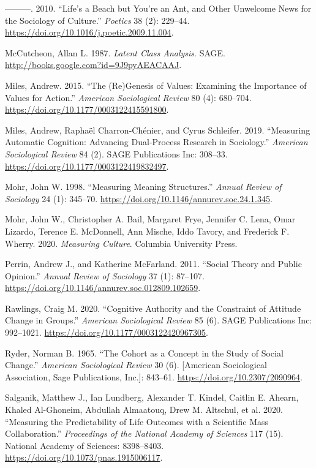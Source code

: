 \documentclass[12pt,]{article}
\begin{document}
\leavevmode\hypertarget{ref-martin2010}{}%
---------. 2010. ``Life's a Beach but You're an Ant, and Other Unwelcome News for the Sociology of Culture.'' \emph{Poetics} 38 (2): 229--44. \url{https://doi.org/10.1016/j.poetic.2009.11.004}.

\leavevmode\hypertarget{ref-mccutcheon1987}{}%
McCutcheon, Allan L. 1987. \emph{Latent Class Analysis}. SAGE. \url{http://books.google.com?id=9J9pyAEACAAJ}.

\leavevmode\hypertarget{ref-miles2015}{}%
Miles, Andrew. 2015. ``The (Re)Genesis of Values: Examining the Importance of Values for Action.'' \emph{American Sociological Review} 80 (4): 680--704. \url{https://doi.org/10.1177/0003122415591800}.

\leavevmode\hypertarget{ref-miles2019}{}%
Miles, Andrew, Raphaël Charron-Chénier, and Cyrus Schleifer. 2019. ``Measuring Automatic Cognition: Advancing Dual-Process Research in Sociology.'' \emph{American Sociological Review} 84 (2). SAGE Publications Inc: 308--33. \url{https://doi.org/10.1177/0003122419832497}.

\leavevmode\hypertarget{ref-mohr1998}{}%
Mohr, John W. 1998. ``Measuring Meaning Structures.'' \emph{Annual Review of Sociology} 24 (1): 345--70. \url{https://doi.org/10.1146/annurev.soc.24.1.345}.

\leavevmode\hypertarget{ref-mohr2020}{}%
Mohr, John W., Christopher A. Bail, Margaret Frye, Jennifer C. Lena, Omar Lizardo, Terence E. McDonnell, Ann Mische, Iddo Tavory, and Frederick F. Wherry. 2020. \emph{Measuring Culture}. Columbia University Press.

\leavevmode\hypertarget{ref-perrin2011}{}%
Perrin, Andrew J., and Katherine McFarland. 2011. ``Social Theory and Public Opinion.'' \emph{Annual Review of Sociology} 37 (1): 87--107. \url{https://doi.org/10.1146/annurev.soc.012809.102659}.

\leavevmode\hypertarget{ref-rawlings2020}{}%
Rawlings, Craig M. 2020. ``Cognitive Authority and the Constraint of Attitude Change in Groups.'' \emph{American Sociological Review} 85 (6). SAGE Publications Inc: 992--1021. \url{https://doi.org/10.1177/0003122420967305}.

\leavevmode\hypertarget{ref-ryder1965}{}%
Ryder, Norman B. 1965. ``The Cohort as a Concept in the Study of Social Change.'' \emph{American Sociological Review} 30 (6). {[}American Sociological Association, Sage Publications, Inc.{]}: 843--61. \url{https://doi.org/10.2307/2090964}.

\leavevmode\hypertarget{ref-salganik2020}{}%
Salganik, Matthew J., Ian Lundberg, Alexander T. Kindel, Caitlin E. Ahearn, Khaled Al-Ghoneim, Abdullah Almaatouq, Drew M. Altschul, et al. 2020. ``Measuring the Predictability of Life Outcomes with a Scientific Mass Collaboration.'' \emph{Proceedings of the National Academy of Sciences} 117 (15). National Academy of Sciences: 8398--8403. \url{https://doi.org/10.1073/pnas.1915006117}.
\end{document}
